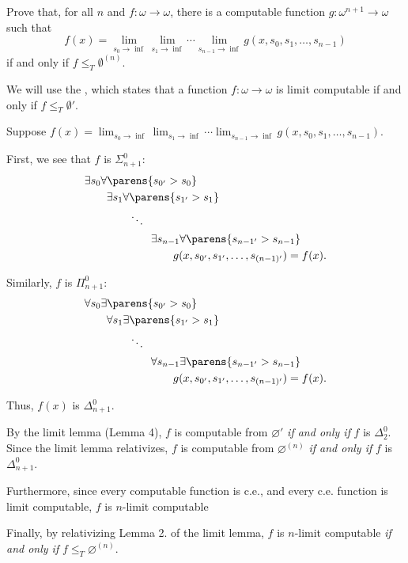 \begin{problem}
  Prove that, for all $n$ and $f : \omega \to \omega$,
  there is a computable function $g : \omega^{n+1} \to \omega$
  such that
  \[
    f(x) =
      \lim_{s_0 \to \inf}
      \lim_{s_1 \to \inf}
      \cdots
      \lim_{s_{n-1} \to \inf}
      g(x, s_0, s_1, \ldots, s_{n-1})
  \]
  if and only if $f \leq_T \emptyset^{(n)}$.

  \begin{answer}
    We will use the ,
    which states that a function $f : \omega \to \omega$
    is limit computable if and only if $f \leq_T \emptyset'$.
    
    Suppose
    $\displaystyle f(x) = \lim_{s_0 \to \inf} \lim_{s_1 \to \inf} \cdots \lim_{s_{n-1} \to \inf} g(x, s_0, s_1, \ldots, s_{n-1})$.

    First, we see that $f$ is $\Sigma^0_{n+1}$:
    \begin{alignat*}{10}
      &\exists s_0 \forall \parens{s_{0'} > s_0} \\
      &\qquad \exists s_1 \forall \parens{s_{1'} > s_1} \\
      &\qquad \qquad \ddots \\
      &\qquad \qquad \qquad \exists s_{n-1} \forall \parens{s_{n-1'} > s_{n-1}} \\
      &\qquad \qquad \qquad \qquad g(x, s_{0'}, s_{1'}, \ldots, s_{(n-1)'}) = f(x).
    \end{alignat*}

    \step
    Similarly, $f$ is $\Pi^0_{n+1}$:
    \begin{alignat*}{10}
      &\forall s_0 \exists \parens{s_{0'} > s_0} \\
      &\qquad \forall s_1 \exists \parens{s_{1'} > s_1} \\
      &\qquad \qquad \ddots \\
      &\qquad \qquad \qquad \forall s_{n-1} \exists \parens{s_{n-1'} > s_{n-1}} \\
      &\qquad \qquad \qquad \qquad g(x, s_{0'}, s_{1'}, \ldots, s_{(n-1)'}) = f(x).
    \end{alignat*}

    \step
    Thus, $f(x)$ is $\Delta^0_{n+1}$.

    By the limit lemma (Lemma 4),
    $f$ is computable from $\varnothing'$
    \emph{if and only if} $f$ is $\Delta^0_2$.
    Since the limit lemma relativizes,
    $f$ is computable from $\varnothing^{(n)}$
    \emph{if and only if} $f$ is $\Delta^0_{n+1}$.

    \step
    Furthermore, since every computable function is c.e.,
    and every c.e. function is limit computable,
    $f$ is $n$-limit computable

    \step
    Finally, by relativizing Lemma 2. of the limit lemma,
    $f$ is $n$-limit computable \emph{if and only if} $f \leq_T \varnothing^{(n)}$.
  \end{answer}
\end{problem}
